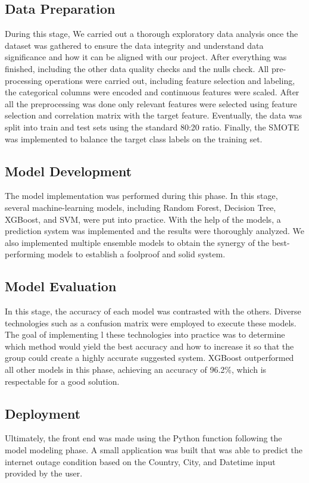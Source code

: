 \subsection {Data Preparation}
During this stage, We carried out a thorough exploratory data analysis once the dataset was gathered to ensure the data integrity and understand data significance and how it can be aligned with our project. After everything was finished, including the other data quality checks and the nulls check. All pre-processing operations were carried out, including feature selection and labeling, the categorical columns were encoded and continuous features were scaled. After all the preprocessing was done only relevant features were selected using feature selection and correlation matrix with the target feature. Eventually, the data was split into train and test sets using the standard 80:20 ratio. Finally, the SMOTE was implemented to balance the target class labels on the training set.

\subsection{Model Development}
\textbf{ } The model implementation was performed during this phase. In this stage, several machine-learning models, including Random Forest, Decision Tree, XGBoost, and SVM, were put into practice. With the help of the models, a prediction system was implemented and the results were thoroughly analyzed. We also implemented multiple ensemble models to obtain the synergy of the best-performing models to establish a foolproof and solid system.

\subsection{Model Evaluation}
\textbf{ } In this stage, the accuracy of each model was contrasted with the others. Diverse technologies such as a confusion matrix were employed to execute these models. The goal of implementing l these technologies into practice was to determine which method would yield the best accuracy and how to increase it so that the group could create a highly accurate suggested system. XGBoost outperformed all other models in this phase, achieving an accuracy of 96.2\%, which is respectable for a good solution.

\subsection{Deployment}
\textbf{ } Ultimately, the front end was made using the Python function following the model modeling phase. A small application was built that was able to predict the internet outage condition based on the Country, City, and Datetime input provided by the user.

